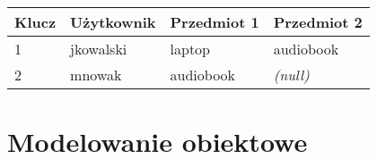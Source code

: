 \documentclass{beamer}
\begin{document}
\begin{frame}
		\begin{center}
			\begin{tabular}{l|l|l|l}
				\multicolumn{1}{c}{\textbf{Klucz}} & \multicolumn{1}{c}{\textbf{Użytkownik}} & \multicolumn{1}{c}{\textbf{Przedmiot 1}} & \textbf{Przedmiot 2} \\
				\hline
				\cellcolor{red!10}1 & \cellcolor{yellow!10}jkowalski & \cellcolor{yellow!10}laptop & \cellcolor{yellow!10}audiobook \\
				\hline
				\cellcolor{red!10}2 & \cellcolor{yellow!10}mnowak & \cellcolor{yellow!10}audiobook & \cellcolor{yellow!10}\textit{(null)} \\
				\hline
			\end{tabular}
		\end{center}
	\end{frame}

	\section{Modelowanie obiektowe}
\end{document}
